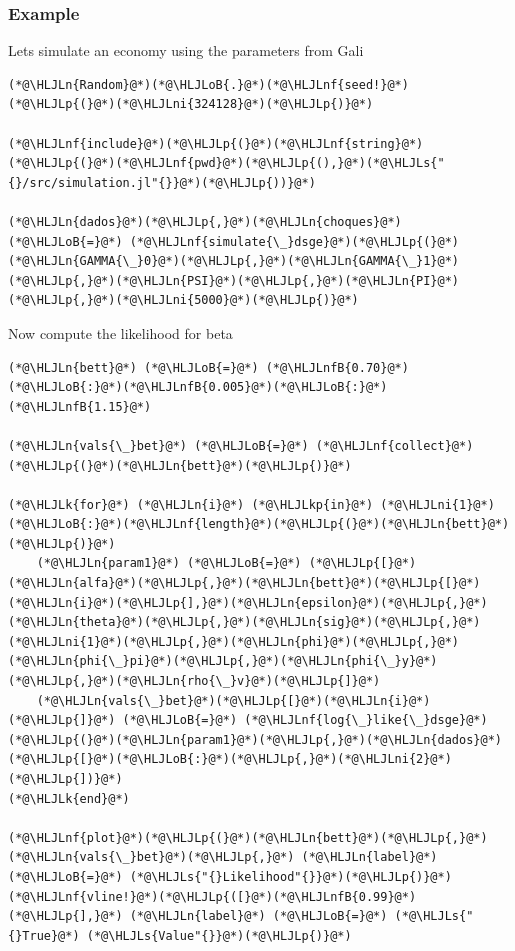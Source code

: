 \documentclass[12pt,a4paper]{article}
\newcommand{\HLJLk}[1]{\textcolor[RGB]{148,91,176}{\textbf{#1}}}
\newcommand{\HLJLkp}[1]{\textcolor[RGB]{148,91,176}{\textbf{#1}}}
\newcommand{\HLJLn}[1]{#1}
\newcommand{\HLJLnf}[1]{\textcolor[RGB]{66,102,213}{#1}}
\newcommand{\HLJLs}[1]{\textcolor[RGB]{201,61,57}{#1}}
\newcommand{\HLJLnfB}[1]{\textcolor[RGB]{59,151,46}{#1}}
\newcommand{\HLJLni}[1]{\textcolor[RGB]{59,151,46}{#1}}
\newcommand{\HLJLoB}[1]{\textcolor[RGB]{102,102,102}{\textbf{#1}}}
\newcommand{\HLJLp}[1]{#1}
\begin{document}
\subsubsection{Example}
Lets simulate an economy using the parameters from Gali


\begin{lstlisting}
(*@\HLJLn{Random}@*)(*@\HLJLoB{.}@*)(*@\HLJLnf{seed!}@*)(*@\HLJLp{(}@*)(*@\HLJLni{324128}@*)(*@\HLJLp{)}@*)

(*@\HLJLnf{include}@*)(*@\HLJLp{(}@*)(*@\HLJLnf{string}@*)(*@\HLJLp{(}@*)(*@\HLJLnf{pwd}@*)(*@\HLJLp{(),}@*)(*@\HLJLs{"{}/src/simulation.jl"{}}@*)(*@\HLJLp{))}@*)

(*@\HLJLn{dados}@*)(*@\HLJLp{,}@*)(*@\HLJLn{choques}@*) (*@\HLJLoB{=}@*) (*@\HLJLnf{simulate{\_}dsge}@*)(*@\HLJLp{(}@*)(*@\HLJLn{GAMMA{\_}0}@*)(*@\HLJLp{,}@*)(*@\HLJLn{GAMMA{\_}1}@*)(*@\HLJLp{,}@*)(*@\HLJLn{PSI}@*)(*@\HLJLp{,}@*)(*@\HLJLn{PI}@*)(*@\HLJLp{,}@*)(*@\HLJLni{5000}@*)(*@\HLJLp{)}@*)
\end{lstlisting}


Now compute the likelihood for beta


\begin{lstlisting}
(*@\HLJLn{bett}@*) (*@\HLJLoB{=}@*) (*@\HLJLnfB{0.70}@*)(*@\HLJLoB{:}@*)(*@\HLJLnfB{0.005}@*)(*@\HLJLoB{:}@*)(*@\HLJLnfB{1.15}@*)

(*@\HLJLn{vals{\_}bet}@*) (*@\HLJLoB{=}@*) (*@\HLJLnf{collect}@*)(*@\HLJLp{(}@*)(*@\HLJLn{bett}@*)(*@\HLJLp{)}@*)

(*@\HLJLk{for}@*) (*@\HLJLn{i}@*) (*@\HLJLkp{in}@*) (*@\HLJLni{1}@*)(*@\HLJLoB{:}@*)(*@\HLJLnf{length}@*)(*@\HLJLp{(}@*)(*@\HLJLn{bett}@*)(*@\HLJLp{)}@*)
    (*@\HLJLn{param1}@*) (*@\HLJLoB{=}@*) (*@\HLJLp{[}@*)(*@\HLJLn{alfa}@*)(*@\HLJLp{,}@*)(*@\HLJLn{bett}@*)(*@\HLJLp{[}@*)(*@\HLJLn{i}@*)(*@\HLJLp{],}@*)(*@\HLJLn{epsilon}@*)(*@\HLJLp{,}@*)(*@\HLJLn{theta}@*)(*@\HLJLp{,}@*)(*@\HLJLn{sig}@*)(*@\HLJLp{,}@*)(*@\HLJLni{1}@*)(*@\HLJLp{,}@*)(*@\HLJLn{phi}@*)(*@\HLJLp{,}@*)(*@\HLJLn{phi{\_}pi}@*)(*@\HLJLp{,}@*)(*@\HLJLn{phi{\_}y}@*)(*@\HLJLp{,}@*)(*@\HLJLn{rho{\_}v}@*)(*@\HLJLp{]}@*)
    (*@\HLJLn{vals{\_}bet}@*)(*@\HLJLp{[}@*)(*@\HLJLn{i}@*)(*@\HLJLp{]}@*) (*@\HLJLoB{=}@*) (*@\HLJLnf{log{\_}like{\_}dsge}@*)(*@\HLJLp{(}@*)(*@\HLJLn{param1}@*)(*@\HLJLp{,}@*)(*@\HLJLn{dados}@*)(*@\HLJLp{[}@*)(*@\HLJLoB{:}@*)(*@\HLJLp{,}@*)(*@\HLJLni{2}@*)(*@\HLJLp{])}@*)
(*@\HLJLk{end}@*)

(*@\HLJLnf{plot}@*)(*@\HLJLp{(}@*)(*@\HLJLn{bett}@*)(*@\HLJLp{,}@*)(*@\HLJLn{vals{\_}bet}@*)(*@\HLJLp{,}@*) (*@\HLJLn{label}@*) (*@\HLJLoB{=}@*) (*@\HLJLs{"{}Likelihood"{}}@*)(*@\HLJLp{)}@*)
(*@\HLJLnf{vline!}@*)(*@\HLJLp{([}@*)(*@\HLJLnfB{0.99}@*)(*@\HLJLp{],}@*) (*@\HLJLn{label}@*) (*@\HLJLoB{=}@*) (*@\HLJLs{"{}True}@*) (*@\HLJLs{Value"{}}@*)(*@\HLJLp{)}@*)
\end{lstlisting}
\end{document}
